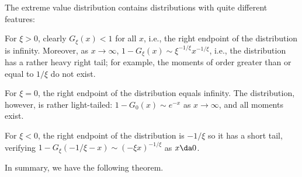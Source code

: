 The extreme value distribution contains distributions with quite different features:
\ben
\item [(i)] For $\xi >0$, clearly $G_{\xi}(x)<1$ for all $x$, i.e., the right endpoint of the distribution is infinity. Moreover, as $x\to\infty$, $1-G_{\xi}(x)\sim \xi^{-1/\xi} x^{-1/\xi}$, i.e., the distribution has a rather heavy right tail; for example, the moments of order greater than or equal to $1/\xi$ do not exist.
\item [(ii)] For $\xi =0$, the right endpoint of the distribution equals infinity. The distribution, however, is rather light-tailed: $1-G_0(x) \sim e^{-x}$ as $x\to \infty$, and all moments exist.
\item [(iii)] For $\xi<0$, the right endpoint of the distribution is $-1/\xi$ so it has a short tail, verifying $1-G_{\xi}(-1/\xi -x)\sim (-\xi x)^{-1/\xi}$ as $x\da 0$.
\een







In summary, we have the following theorem.


